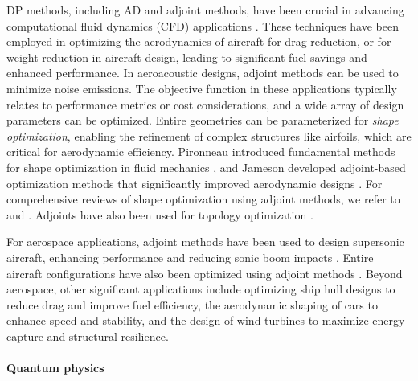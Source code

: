 DP methods, including AD and adjoint methods, have been crucial in advancing computational fluid dynamics (CFD) applications \cite{KENWAY2019100542}. 
These techniques have been employed in optimizing the aerodynamics of aircraft for drag reduction, or for weight reduction in aircraft design, leading to significant fuel savings and enhanced performance. 
In aeroacoustic designs, adjoint methods can be used to minimize noise emissions. 
The objective function in these applications typically relates to performance metrics or cost considerations, and a wide array of design parameters can be optimized.
Entire geometries can be parameterized for \emph{shape optimization}, enabling the refinement of complex structures like airfoils, which are critical for aerodynamic efficiency. 
Pironneau introduced fundamental methods for shape optimization in fluid mechanics \cite{Pironneau_1974}, and Jameson developed adjoint-based optimization methods that significantly improved aerodynamic designs \cite{Jameson_1988}. 
For comprehensive reviews of shape optimization using adjoint methods, we refer to \cite{Giles_Pierce_2000} and \cite{mohammadi2009applied}. 
Adjoints have also been used for topology optimization \cite{allaire2014shape}.

For aerospace applications, adjoint methods have been used to design supersonic aircraft, enhancing performance and reducing sonic boom impacts \cite{hu2010supersonic,fike2013multi}. 
Entire aircraft configurations have also been optimized using adjoint methods \cite{chen2016aerodynamic}. 
Beyond aerospace, other significant applications include optimizing ship hull designs to reduce drag and improve fuel efficiency, the aerodynamic shaping of cars to enhance speed and stability, and the design of wind turbines to maximize energy capture and structural resilience.

\paragraph{Quantum physics}

